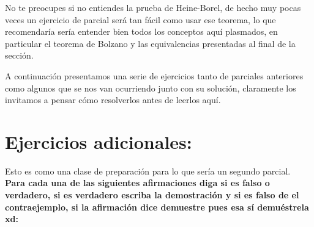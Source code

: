 \begin{note}
No te preocupes si no entiendes la prueba de Heine-Borel, de hecho muy pocas veces un ejercicio de parcial será tan fácil como usar ese teorema, lo que recomendaría sería entender bien todos los conceptos aquí plasmados, en particular el teorema de Bolzano y las equivalencias presentadas al final de la sección.
\end{note}

\begin{note}
A continuación presentamos una serie de ejercicios tanto de parciales anteriores como algunos que se nos van ocurriendo junto con su solución, claramente los invitamos a pensar cómo resolverlos antes de leerlos aquí.
\end{note}


\section{Ejercicios adicionales:}


Esto es como una clase de preparación para lo que sería un segundo parcial.\\

\textbf{Para cada una de las siguientes afirmaciones diga si es falso o verdadero, si es verdadero escriba la demostración y si es falso de el contraejemplo, si la afirmación dice demuestre pues esa sí demuéstrela xd:}

